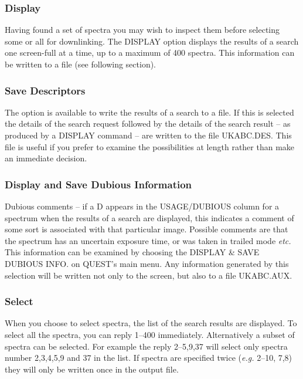 \normalsize
\subsubsection{Display}
Having found a set of spectra you may wish to inspect them before selecting 
some or all for downlinking.
The DISPLAY option displays the results of a search one screen-full at a time,
up to a maximum of 400 spectra.
This information can be written to a file (see following section).

\subsubsection {Save Descriptors}

The option is available to write the results of a search to a file.
If this is selected the details
of the search request
followed by the details of the search result -- as produced by a DISPLAY
command -- are written to the file UKABC.DES.
This file is useful if you prefer to examine the possibilities at length
rather than make an immediate decision. 

\subsubsection {Display and Save Dubious Information}

Dubious comments -- if a D appears in the USAGE/DUBIOUS column for
a spectrum when
the results of a search are displayed,
this indicates a comment of some sort is associated with that particular image.
Possible comments are that the spectrum has an  uncertain exposure time, or
was taken in trailed mode {\it etc.}
This information can be examined by choosing
the DISPLAY \& SAVE DUBIOUS INFO. on QUEST's main menu.
Any information generated by this selection will be written not
only to the screen, but also to a file UKABC.AUX.

\subsubsection{Select}

When you choose to select spectra, 
the list of the search results are displayed.
To select all the spectra, you can reply 1--400 immediately.
Alternatively a subset of spectra can be selected. For example the reply 
2--5,9,37 will select only spectra number 2,3,4,5,9 and 37 in the list.
If spectra are specified twice ({\it e.g.} 2--10, 7,8) they will 
only be written once in the output file.

